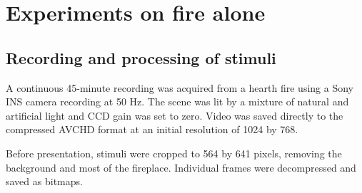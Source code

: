 \chapter{Experiments on fire alone}

\section{Recording and processing of stimuli}

A continuous 45-minute recording was acquired from a hearth fire using a Sony INS camera recording at 50 Hz. The scene was lit by a mixture of natural and artificial light and CCD gain was set to zero. Video was saved directly to the compressed AVCHD format at an initial resolution of 1024 by 768.

Before presentation, stimuli were cropped to 564 by 641 pixels, removing the background and most of the fireplace. Individual frames were decompressed and saved as bitmaps. 



